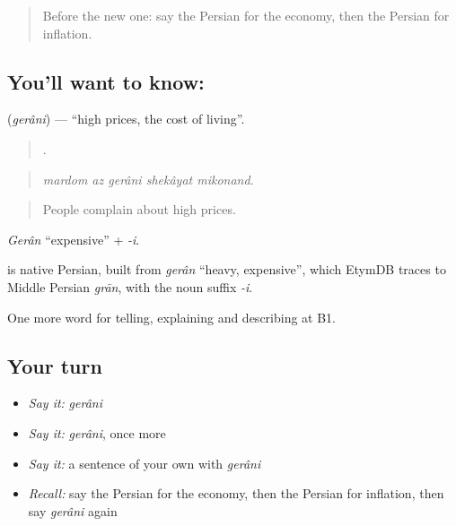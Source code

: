 \label{lesson:FA-C413-gerani}



\begin{quote}
Before the new one: say the Persian for the economy, then the Persian for inflation.
\end{quote}

\subsection*{You'll want to know: }
\textbf{} (\emph{gerâni}) — \textquotedblleft{}high prices, the cost of living\textquotedblright{}.

\begin{quote}
    .
\end{quote}

\begin{quote}
\emph{mardom az gerâni shekâyat mikonand.}
\end{quote}

\begin{quote}
People complain about high prices.
\end{quote}

\emph{Gerân} \textquotedblleft{}expensive\textquotedblright{} + \emph{-i}.

\begin{cousinweb}
\textbf{} is native Persian, built from \emph{gerân} \textquotedblleft{}heavy, expensive\textquotedblright{}, which EtymDB traces to Middle Persian \emph{grān}, with the noun suffix \emph{-i}.
\end{cousinweb}

\begin{grammarlens}[title={What you've built}]
One more word for telling, explaining and describing at B1.
\end{grammarlens}

\subsection*{Your turn}
\begin{itemize}
\raggedright
  \item \emph{Say it:} \emph{gerâni}
  \item \emph{Say it:} \emph{gerâni}, once more
  \item \emph{Say it:} a sentence of your own with \emph{gerâni}
  \item \emph{Recall:} say the Persian for the economy, then the Persian for inflation, then say \emph{gerâni} again
\end{itemize}

